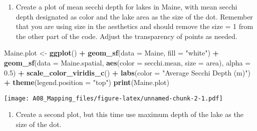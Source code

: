 \documentclass[]{article}
\newenvironment{Shaded}{\begin{snugshade}}{\end{snugshade}}
\newcommand{\DataTypeTok}[1]{\textcolor[rgb]{0.13,0.29,0.53}{#1}}
\newcommand{\FloatTok}[1]{\textcolor[rgb]{0.00,0.00,0.81}{#1}}
\newcommand{\KeywordTok}[1]{\textcolor[rgb]{0.13,0.29,0.53}{\textbf{#1}}}
\newcommand{\NormalTok}[1]{#1}
\newcommand{\OperatorTok}[1]{\textcolor[rgb]{0.81,0.36,0.00}{\textbf{#1}}}
\newcommand{\StringTok}[1]{\textcolor[rgb]{0.31,0.60,0.02}{#1}}
\providecommand{\tightlist}{%
  \setlength{\itemsep}{0pt}\setlength{\parskip}{0pt}}
\begin{document}
\begin{enumerate}
\def\labelenumi{\arabic{enumi}.}
\setcounter{enumi}{5}
\tightlist
\item
  Create a plot of mean secchi depth for lakes in Maine, with mean
  secchi depth designated as color and the lake area as the size of the
  dot. Remember that you are using size in the aesthetics and should
  remove the size = 1 from the other part of the code. Adjust the
  transparency of points as needed.
\end{enumerate}

\begin{Shaded}
\begin{Highlighting}[]
\NormalTok{Maine.plot <-}\StringTok{ }\KeywordTok{ggplot}\NormalTok{() }\OperatorTok{+}
\StringTok{  }\KeywordTok{geom_sf}\NormalTok{(}\DataTypeTok{data =}\NormalTok{ Maine, }\DataTypeTok{fill =} \StringTok{"white"}\NormalTok{) }\OperatorTok{+}
\StringTok{  }\KeywordTok{geom_sf}\NormalTok{(}\DataTypeTok{data =}\NormalTok{ Maine.spatial, }\KeywordTok{aes}\NormalTok{(}\DataTypeTok{color =}\NormalTok{ secchi.mean, }\DataTypeTok{size =}\NormalTok{ area), }
          \DataTypeTok{alpha =} \FloatTok{0.5}\NormalTok{) }\OperatorTok{+}
\StringTok{  }\KeywordTok{scale_color_viridis_c}\NormalTok{() }\OperatorTok{+}
\StringTok{  }\KeywordTok{labs}\NormalTok{(}\DataTypeTok{color =} \StringTok{"Average Secchi Depth (m)"}\NormalTok{) }\OperatorTok{+}
\StringTok{  }\KeywordTok{theme}\NormalTok{(}\DataTypeTok{legend.position =} \StringTok{"top"}\NormalTok{)}
\KeywordTok{print}\NormalTok{(Maine.plot)}
\end{Highlighting}
\end{Shaded}

\texttt{[image: A08\_Mapping\_files/figure-latex/unnamed-chunk-2-1.pdf]}

\begin{enumerate}
\def\labelenumi{\arabic{enumi}.}
\setcounter{enumi}{6}
\tightlist
\item
  Create a second plot, but this time use maximum depth of the lake as
  the size of the dot.
\end{enumerate}
\end{document}
